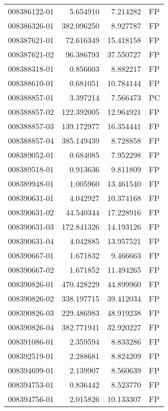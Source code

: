 \begin{tabular}{lrrl}
008386122-01 &    5.654910 &       7.214282 &   FP \\
008386326-01 &  382.096250 &       8.927787 &   FP \\
008387621-01 &   72.616349 &      15.418158 &   FP \\
008387621-02 &   96.386793 &      37.550727 &   FP \\
008388318-01 &    0.856603 &       8.882217 &   FP \\
008388610-01 &    0.681051 &      10.784144 &   FP \\
008388857-01 &    3.397214 &       7.566473 &   PC \\
008388857-02 &  122.392005 &      12.964921 &   FP \\
008388857-03 &  139.172977 &      16.354441 &   FP \\
008388857-04 &  385.149439 &       8.728858 &   FP \\
008389052-01 &    0.684085 &       7.952298 &   FP \\
008389518-01 &    0.913636 &       9.811809 &   FP \\
008389948-01 &    1.005960 &      13.461540 &   FP \\
008390631-01 &    4.042927 &      10.374168 &   FP \\
008390631-02 &   44.540344 &      17.228916 &   FP \\
008390631-03 &  172.841326 &      14.193126 &   FP \\
008390631-04 &    4.042885 &      13.957521 &   FP \\
008390667-01 &    1.671832 &       9.466663 &   FP \\
008390667-02 &    1.671852 &      11.494265 &   FP \\
008390826-01 &  470.428229 &      44.899960 &   FP \\
008390826-02 &  338.197715 &      39.412034 &   FP \\
008390826-03 &  229.486983 &      48.919238 &   FP \\
008390826-04 &  382.771941 &      32.920227 &   FP \\
008391086-01 &    2.359594 &       8.833286 &   FP \\
008392519-01 &    2.288681 &       8.824209 &   FP \\
008394699-01 &    2.139907 &       8.560639 &   FP \\
008394753-01 &    0.836442 &       8.523770 &   FP \\
008394756-01 &    2.015826 &      10.133307 &   FP \\

\end{tabular}
